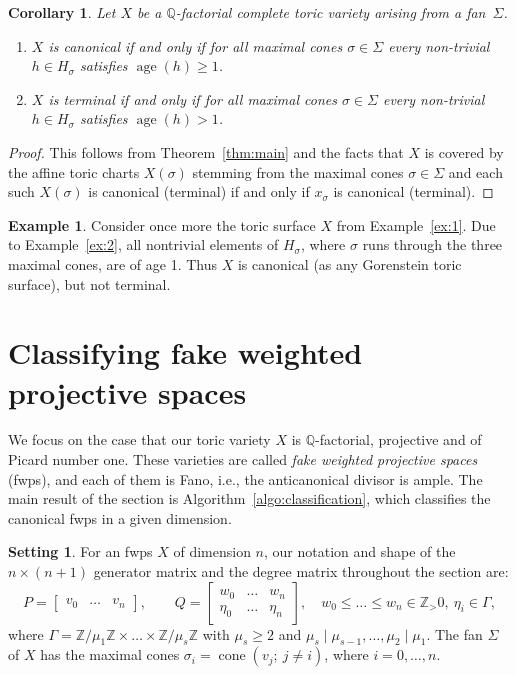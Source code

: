 \documentclass{amsart}
\newcommand{\Q}{\mathbb{Q}}
\newcommand{\Z}{\mathbb{Z}}
\DeclareMathOperator{\cone}{cone}
\DeclareMathOperator{\age}{age}
\theoremstyle{plain}
\newtheorem{corollary}[theorem]{Corollary}
\theoremstyle{definition}
\newtheorem{example}[theorem]{Example}
\newtheorem{setting}[theorem]{Setting}
\begin{document}
\begin{corollary}
Let $X$ be a $\Q$-factorial complete toric variety arising from a
fan~$\Sigma$.
\begin{enumerate}
\item
$X$ is canonical if and only if for all maximal cones
$\sigma\in\Sigma$ every non-trivial $h \in H_\sigma$
satisfies $\age(h)\ge 1$.
\item
$X$ is terminal if and only if for all maximal cones
$\sigma\in\Sigma$ every non-trivial $h \in H_\sigma$
satisfies $\age(h) > 1$.
\end{enumerate}
\end{corollary}

\begin{proof}
This follows from Theorem~\ref{thm:main} and the facts
that $X$ is covered by the affine toric charts $X(\sigma)$
stemming from the maximal cones $\sigma \in \Sigma$
and each such $X(\sigma)$ is canonical (terminal)
if and only if $x_\sigma$ is canonical (terminal).
\end{proof}


\begin{example}\label{ex:3}
Consider once more the toric surface $X$ from Example~\ref{ex:1}.
Due to Example~\ref{ex:2}, all nontrivial elements of $H_\sigma$,
where $\sigma$ runs through the three maximal cones, are of age 1.
Thus $X$ is canonical (as any Gorenstein toric surface), but not terminal.
\end{example}

\section{Classifying fake weighted projective spaces}\label{sec:fwps}

We focus on the case that our toric variety $X$ is $\Q$-factorial, projective and
of Picard number one. These varieties are called \emph{fake weighted projective spaces}
(fwps), and each of them is Fano, i.e., the anticanonical divisor is ample.
The main result of the section is Algorithm~\ref{algo:classification}, which
classifies the canonical fwps in a given dimension.

\begin{setting}\label{setting-sec-2}
For an fwps $X$ of dimension $n$, our notation and shape of the
$n \times (n+1)$ generator matrix and the degree matrix throughout
the section are:
$$
P=\begin{bmatrix}
v_0 & \dots & v_n
\end{bmatrix},
\qquad
Q
=
\begin{bmatrix}
w_0 & \dots & w_n
\\
\eta_0 & \dots & \eta_n
\end{bmatrix},
\quad
w_0 \le \ldots \le w_n \in \Z_>0, \ \eta_i\in \Gamma,
$$
where $\Gamma = \Z/\mu_1\Z\times\dots\times\Z/\mu_s\Z$ with $\mu_s\geq 2$ and
$\mu_s\mid\mu_{s-1},\dots,\mu_2\mid\mu_1$.
The fan $\Sigma$ of $X$ has the maximal cones $\sigma_i=\cone(v_j;\ j\neq i)$,
where $i=0,\dots,n$.
\end{setting}
\end{document}
